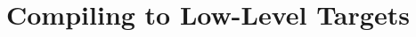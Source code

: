 \chapter{Compiling to Low-Level Targets}\label{chap:low_level_targets}





% 

\listoffigures
\listoftables
{}
\printbibliography[heading=bibintoc]

%

